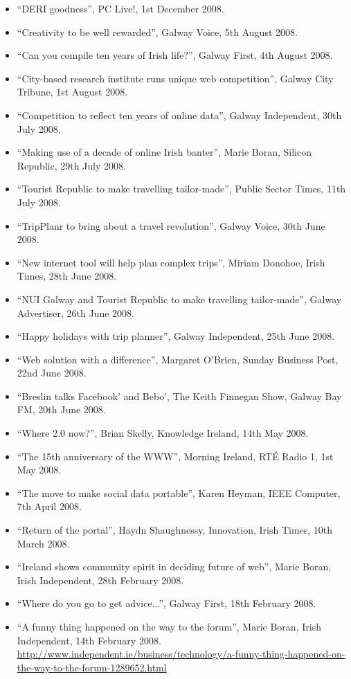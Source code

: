 \documentclass[10pt,a4paper]{res} %
\begin{document}
\begin{resume}
{\begin{itemize}
\item ``DERI goodness'', PC Live!, 1st December 2008.
\item ``Creativity to be well rewarded'', Galway Voice, 5th August 2008.
\item ``Can you compile ten years of Irish life?'', Galway First, 4th August 2008.
\item ``City-based research institute runs unique web competition'', Galway City Tribune, 1st August 2008.
\item ``Competition to reflect ten years of online data'', Galway Independent, 30th July 2008.
\item ``Making use of a decade of online Irish banter'', Marie Boran, Silicon Republic, 29th July 2008.
\item ``Tourist Republic to make travelling tailor-made'', Public Sector Times, 11th July 2008.
\item ``TripPlanr to bring about a travel revolution'', Galway Voice, 30th June 2008.
\item ``New internet tool will help plan complex trips'', Miriam Donohoe, Irish Times, 28th June 2008.
\item ``NUI Galway and Tourist Republic to make travelling tailor-made'', Galway Advertiser, 26th June 2008.
\item ``Happy holidays with trip planner'', Galway Independent, 25th June 2008.
\item ``Web solution with a difference'', Margaret O'Brien, Sunday Business Post, 22nd June 2008.
\item ``Breslin talks Facebook' and Bebo', The Keith Finnegan Show, Galway Bay FM, 20th June 2008.
\item ``Where 2.0 now?'', Brian Skelly, Knowledge Ireland, 14th May 2008.
\item ``The 15th anniversary of the WWW'', Morning Ireland, RT\'{E} Radio 1, 1st May 2008.
\item ``The move to make social data portable'', Karen Heyman, IEEE Computer, 7th April 2008.
\item ``Return of the portal'', Haydn Shaughnessy, Innovation, Irish Times, 10th March 2008.
\item ``Ireland shows community spirit in deciding future of web'', Marie Boran, Irish Independent, 28th February 2008.
\item ``Where do you go to get advice...'', Galway First, 18th February 2008.
\item ``A funny thing happened on the way to the forum'', Marie Boran, Irish Independent, 14th February 2008. \url{http://www.independent.ie/business/technology/a-funny-thing-happened-on-the-way-to-the-forum-1289652.html}

\end{itemize}}
\end{resume}
\end{document}
